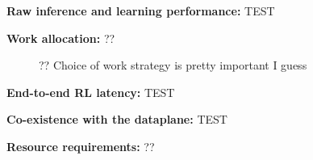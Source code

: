 \documentclass[sigconf,natbib=false]{acmart}
\newcommand{\fakepara}[1]{\noindent\textbf{#1:}}
\newcommand{\approachshort}{OPaL}
\begin{document}
\fakepara{Raw inference and learning performance}
TEST

\fakepara{Work allocation}
?? 

\begin{figure}
	\caption{?? Choice of work strategy is pretty important I guess\label{fig:work-alloc-32}}
\end{figure}

\fakepara{End-to-end RL latency}
TEST

\fakepara{Co-existence with the dataplane}
TEST

\fakepara{Resource requirements}
?? 

\begin{table}
\caption{NFP memory use due to \approachshort{}. CLS and CTM are shared between all programs on the same island (placing our RL agent on i5), while EMEM and IMEM are shared between all NFP programs on a NIC.\label{tab:resources}}
\end{table}
\end{document}
